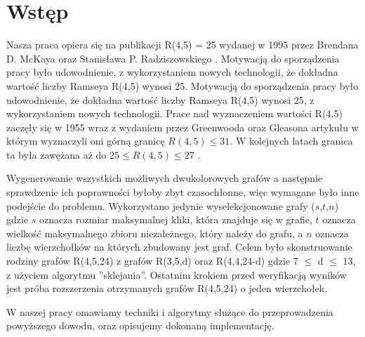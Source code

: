 \chapter{Wstęp}

Nasza praca opiera się na publikacji R(4,5) = 25 wydanej w 1995 przez Brendana D. McKaya oraz Stanisława P. Radziszowskiego  \cite{mainpaper}. Motywacją do sporządzenia pracy było udowodnienie, z wykorzystaniem nowych technologii, że dokładna wartość liczby Ramseya R(4,5) wynosi 25.  Motywacją do sporządzenia pracy było udowodnienie, że dokładna wartość liczby Ramseya R(4,5) wynosi 25, z wykorzystaniem nowych technologii. Prace nad wyznaczeniem wartości R(4,5) zaczęły się w 1955 wraz z wydaniem przez Greenwooda oraz Gleasona\cite{gandg} artykułu w którym wyznaczyli oni górną granicę $R(4,5) \leq 31$. W kolejnych latach granica ta była zawężana aż do $25 \leq R(4,5) \leq 27$ \cite{jgbound, mrbound}.\par
Wygenerowanie wszystkich możliwych dwukolorowych grafów a następnie sprawdzenie ich poprawności byłoby zbyt czasochłonne, więc wymagane było inne podejście do problemu. Wykorzystano jedynie wyselekcjonowane grafy ($s$,$t$,$n$) gdzie $s$ oznacza rozmiar maksymalnej kliki, która znajduje się w grafie, $t$ oznacza wielkość maksymalnego zbioru niezależnego, który należy do grafu, a $n$ oznacza liczbę wierzchołków na których zbudowany jest graf. Celem było skonstruowanie rodziny grafów R(4,5,24) z grafów R(3,5,d) oraz R(4,4,24-d) gdzie 7 $\leq$ d $\leq$ 13, z użyciem algorytmu ''sklejania''. Ostatnim krokiem przed weryfikacją wyników jest próba rozszerzenia otrzymanych grafów R(4,5,24) o jeden wierzchołek.

W naszej pracy omawiamy techniki i algorytmy służące do przeprowadzenia powyższego dowodu, oraz opisujemy dokonaną implementację.

